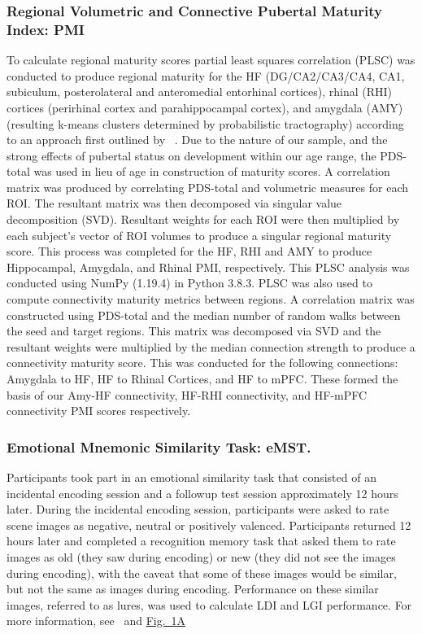 \documentclass[11pt]{article}
\providecommand\citep{\cite}
\begin{document}
\subsubsection*{Regional Volumetric and Connective Pubertal Maturity Index: PMI}
To calculate regional maturity scores partial least squares correlation (PLSC) was
conducted to produce regional maturity for the HF (DG/CA2/CA3/CA4, CA1, subiculum,
posterolateral and anteromedial entorhinal cortices), rhinal (RHI) cortices (perirhinal
cortex and parahippocampal cortex), and amygdala (AMY) (resulting k-means clusters
determined by probabilistic tractography) according to an approach first outlined by
~\cite{keresztes_adaptive_2017}. Due to the nature of our sample, and the strong effects of
pubertal status on development within our age range, the PDS-total was used in lieu of
age in construction of maturity scores. A correlation matrix was produced by correlating
PDS-total and volumetric measures for each ROI\@. The resultant matrix was then
decomposed via singular value decomposition (SVD). Resultant weights for each ROI were
then multiplied by each subject's vector of ROI volumes to produce a singular regional
maturity score. This process was completed for the HF, RHI and AMY to produce
Hippocampal, Amygdala, and Rhinal PMI, respectively. This PLSC analysis was conducted
using NumPy (1.19.4) \citep{harris_numpy_2020} in Python 3.8.3.
PLSC was also used to compute connectivity maturity metrics between regions. A
correlation matrix was constructed using PDS-total and the median number of random walks
between the seed and target regions. This matrix was decomposed via SVD and the
resultant weights were multiplied by the median connection strength to produce a
connectivity maturity score. This was conducted for the following connections:
Amygdala to HF, HF to Rhinal Cortices, and HF to mPFC\@. These formed the basis of our
Amy-HF connectivity, HF-RHI connectivity, and HF-mPFC
connectivity PMI scores respectively.

\subsubsection*{Emotional Mnemonic Similarity Task: eMST.} Participants took part in an
emotional similarity task that consisted of an incidental encoding session and a followup test session approximately 12 hours later.
During the incidental encoding session, participants were asked to rate scene images as negative, neutral or positively valenced.
Participants returned 12 hours later and completed a recognition memory task that asked them to rate images as old (they saw during encoding)
or new (they did not see the images during encoding),
with the caveat that some of these images would be similar, but not the same as images during encoding.
Performance on these similar images, referred to as lures, was used to calculate LDI and LGI performance.
For more information, see~\cite{mcmakin_negative_2021} and \hyperref[fig:1]{Fig.\ 1A}\par
\end{document}
